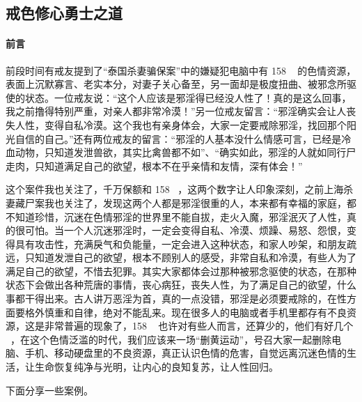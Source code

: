 \subsection{戒色修心勇士之道}

\paragraph{前言}

前段时间有戒友提到了“泰国杀妻骗保案”中的嫌疑犯电脑中有 158 \unit{\giga\byte} 的色情资源，表面上沉默寡言、老实本分，对妻子关心备至，另一面却是极度扭曲、被邪念所驱使的状态。一位戒友说：“这个人应该是邪淫得已经没人性了！真的是这么回事，我之前撸得特别严重，对亲人都非常冷漠！”另一位戒友留言：“邪淫确实会让人丧失人性，变得自私冷漠。这个我也有亲身体会，大家一定要戒除邪淫，找回那个阳光自信的自己。”还有两位戒友的留言：“邪淫的人基本没什么情感可言，已经是冷血动物，只知道发泄兽欲，其实比禽兽都不如”、“确实如此，邪淫的人就如同行尸走肉，只知道满足自己的欲望，根本不在乎亲情和友情，深有体会！”

这个案件我也关注了，千万保额和 158 \unit{\giga\byte}，这两个数字让人印象深刻，之前上海杀妻藏尸案我也关注了，发现这两个人都是邪淫很重的人，本来都有幸福的家庭，都不知道珍惜，沉迷在色情邪淫的世界里不能自拔，走火入魔，邪淫泯灭了人性，真的很可怕。当一个人沉迷邪淫时，一定会变得自私、冷漠、烦躁、易怒、怨恨，变得具有攻击性，充满戾气和负能量，一定会进入这种状态，和家人吵架，和朋友疏远，只知道发泄自己的欲望，根本不顾别人的感受，非常自私和冷漠，有些人为了满足自己的欲望，不惜去犯罪。其实大家都体会过那种被邪念驱使的状态，在那种状态下会做出各种荒唐的事情，丧心病狂，丧失人性，为了满足自己的欲望，什么事都干得出来。古人讲万恶淫为首，真的一点没错，邪淫是必须要戒除的，在性方面要格外慎重和自律，绝对不能乱来。现在很多人的电脑或者手机里都存有不良资源，这是非常普遍的现象了，158 \unit{\giga\byte} 也许对有些人而言，还算少的，他们有好几个 \unit{\tera\byte}，在这个色情泛滥的时代，我们应该来一场“删黄运动”，号召大家一起删除电脑、手机、移动硬盘里的不良资源，真正认识色情的危害，自觉远离沉迷色情的生活，让生命恢复纯净与光明，让内心的良知复苏，让人性回归。

下面分享一些案例。


